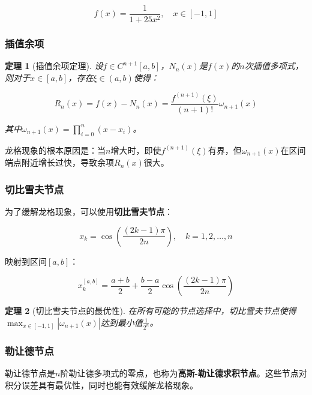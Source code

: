 \documentclass[a4paper,12pt]{article}
\newtheorem{theorem}{定理}[section]
\theoremstyle{definition}
\begin{document}
\begin{equation}
f(x) = \frac{1}{1 + 25x^2}, \quad x \in [-1, 1]
\end{equation}

\subsubsection{插值余项}

\begin{theorem}[插值余项定理]
设$f \in C^{n+1}[a, b]$，$N_n(x)$是$f(x)$的$n$次插值多项式，则对于$x \in [a, b]$，存在$\xi \in (a, b)$使得：

\begin{equation}
R_n(x) = f(x) - N_n(x) = \frac{f^{(n+1)}(\xi)}{(n+1)!} \omega_{n+1}(x)
\end{equation}

其中$\omega_{n+1}(x) = \prod_{i=0}^{n}(x - x_i)$。
\end{theorem}

龙格现象的根本原因是：当$n$增大时，即使$f^{(n+1)}(\xi)$有界，但$\omega_{n+1}(x)$在区间端点附近增长过快，导致余项$R_n(x)$很大。

\subsubsection{切比雪夫节点}

为了缓解龙格现象，可以使用\textbf{切比雪夫节点}：

\begin{equation}
x_k = \cos\left(\frac{(2k-1)\pi}{2n}\right), \quad k = 1, 2, \ldots, n
\end{equation}

映射到区间$[a, b]$：

\begin{equation}
x_k^{[a,b]} = \frac{a + b}{2} + \frac{b - a}{2} \cos\left(\frac{(2k-1)\pi}{2n}\right)
\end{equation}

\begin{theorem}[切比雪夫节点的最优性]
在所有可能的节点选择中，切比雪夫节点使得$\max_{x \in [-1,1]} |\omega_{n+1}(x)|$达到最小值$\frac{1}{2^n}$。
\end{theorem}

\subsubsection{勒让德节点}

勒让德节点是$n$阶勒让德多项式的零点，也称为\textbf{高斯-勒让德求积节点}。这些节点对积分误差具有最优性，同时也能有效缓解龙格现象。
\end{document}
